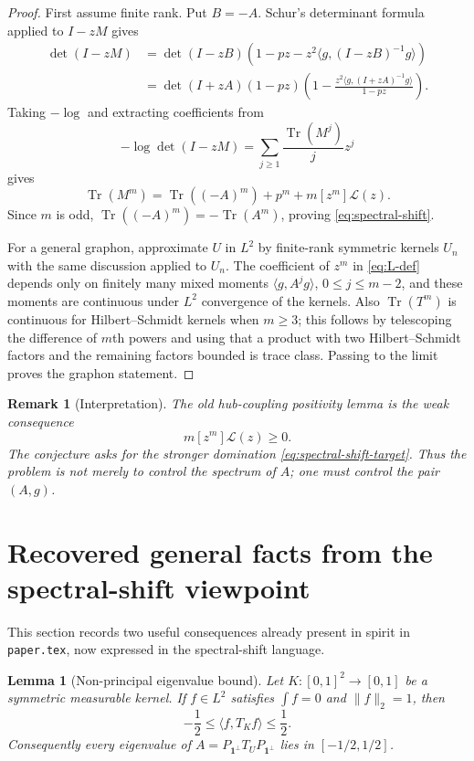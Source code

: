 \documentclass[11pt]{article}
\newtheorem{lemma}[theorem]{Lemma}
\newtheorem{remark}[theorem]{Remark}
\newcommand{\one}{\mathbf 1}
\newcommand{\ip}[2]{\langle #1,#2\rangle}
\newcommand{\Tr}{\operatorname{Tr}}
\newcommand{\norm}[1]{\lVert #1\rVert}
\begin{document}
\begin{proof}
First assume finite rank.  Put $B=-A$.  Schur's determinant formula applied to $I-zM$ gives
\[
\begin{aligned}
        \det(I-zM)
        &=\det(I-zB)
          \left(1-pz-z^2\ip{g}{(I-zB)^{-1}g}\right)       \\
        &=\det(I+zA)(1-pz)
          \left(1-
          \frac{z^2\ip{g}{(I+zA)^{-1}g}}{1-pz}
          \right).
\end{aligned}
\]
Taking $-\log$ and extracting coefficients from
\[
        -\log\det(I-zM)=\sum_{j\ge1}\frac{\Tr(M^j)}{j}z^j
\]
gives
\[
        \Tr(M^m)=\Tr((-A)^m)+p^m+m[z^m]\mathcal L(z).
\]
Since $m$ is odd, $\Tr((-A)^m)=-\Tr(A^m)$, proving \eqref{eq:spectral-shift}.

For a general graphon, approximate $U$ in $L^2$ by finite-rank symmetric kernels $U_n$ with the same discussion applied to $U_n$.  The coefficient of $z^m$ in \eqref{eq:L-def} depends only on finitely many mixed moments $\ip{g}{A^j g}$, $0\le j\le m-2$, and these moments are continuous under $L^2$ convergence of the kernels.  Also $\Tr(T^m)$ is continuous for Hilbert--Schmidt kernels when $m\ge3$; this follows by telescoping the difference of $m$th powers and using that a product with two Hilbert--Schmidt factors and the remaining factors bounded is trace class.  Passing to the limit proves the graphon statement.
\end{proof}

\begin{remark}[Interpretation]
The old hub-coupling positivity lemma is the weak consequence
\[
        m[z^m]\mathcal L(z)\ge0.
\]
The conjecture asks for the stronger domination \eqref{eq:spectral-shift-target}.  Thus the problem is not merely to control the spectrum of $A$; one must control the pair $(A,g)$.
\end{remark}

\section{Recovered general facts from the spectral-shift viewpoint}

This section records two useful consequences already present in spirit in \texttt{paper.tex}, now expressed in the spectral-shift language.

\begin{lemma}[Non-principal eigenvalue bound]\label{lem:half-bound}
Let $K:[0,1]^2\to[0,1]$ be a symmetric measurable kernel.  If $f\in L^2$ satisfies $\int f=0$ and $\norm f_2=1$, then
\[
        -\frac12\le \ip{f}{T_K f}\le\frac12.
\]
Consequently every eigenvalue of $A=P_{\one^\perp}T_UP_{\one^\perp}$ lies in $[-1/2,1/2]$.
\end{lemma}
\end{document}
